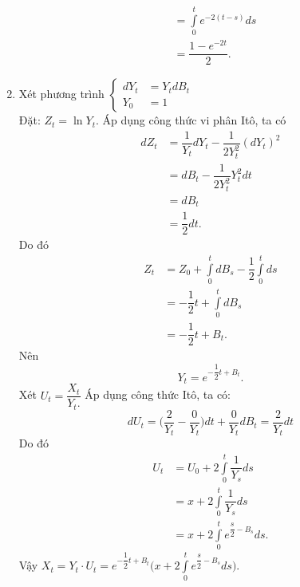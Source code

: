 \begin{sol*}
\begin{enumerate}
\begin{align*}
        &= \displaystyle\int\limits_0^t e^{-2(t-s)}ds\\
        &= \dfrac{1-e^{-2t}}{2}.
    \end{align*}
    \item Xét phương trình
    $\begin{cases}
            dY_t &= Y_tdB_t \\
            Y_0 &=  1
    \end{cases}$\\
    Đặt: $Z_t = \ln Y_t$. Áp dụng công thức vi phân Itô, ta có
    \begin{align*}
        dZ_t &= \dfrac{1}{Y_t}dY_t - \dfrac{1}{2Y_t^2}(dY_t)^2\\
        &= dB_t - \dfrac{1}{2Y_t^2}Y_t^2dt\\
        &= dB_t\\
        &=\dfrac{1}{2}dt.
    \end{align*}
    Do đó
    \begin{align*}
        Z_t &= Z_0 + \displaystyle\int\limits_0^tdB_s -\dfrac{1}{2}\displaystyle\int\limits_0^t ds\\
        &= -\dfrac{1}{2}t + \displaystyle\int\limits_0^tdB_s\\
        &= -\dfrac{1}{2}t + B_t.
    \end{align*}
    Nên \[Y_t = e^{-\dfrac{1}{2}t + B_t}.\]
    Xét $U_t = \dfrac{X_t}{Y_t.}$ Áp dụng công thức Itô, ta có: \[dU_t = \bigg(\dfrac{2}{Y_t} - \dfrac{0}{Y_t}\bigg)dt + \dfrac{0}{Y_t}dB_t = \dfrac{2}{Y_t}dt\]
    Do đó 
    \begin{align*}
        U_t &= U_0 + 2\displaystyle\int\limits_0^t\dfrac{1}{Y_s}ds\\
        &= x + 2\displaystyle\int\limits_0^t\dfrac{1}{Y_s}ds\\
        &= x + 2\displaystyle\int\limits_0^t e^{\dfrac{s}{2} - B_s}ds.
    \end{align*}
    Vậy $X_t = Y_t \cdot U_t = e^{-\dfrac{1}{2}t + B_t}\bigg(x + 2\displaystyle\int\limits_0^t e^{\dfrac{s}{2} - B_s}ds\bigg).$
\end{enumerate}    
\end{sol*}
